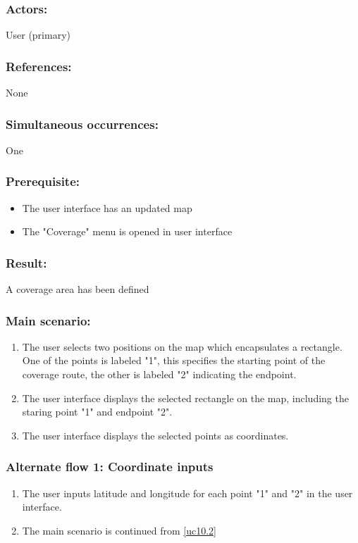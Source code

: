 \subsubsection*{Actors:}
User (primary)

\subsubsection*{References:}
None

\subsubsection*{Simultaneous occurrences:}
One

\subsubsection*{Prerequisite:}
\begin{itemize}
	\item The user interface has an updated map
	\item The "Coverage" menu is opened in user interface
\end{itemize}

\subsubsection*{Result:}
A coverage area has been defined

\subsubsection*{Main scenario:}
\begin{enumerate}
	\item The user selects two positions on the map which encapsulates a rectangle. One of the points is labeled "1", this specifies the starting point of the coverage route, the other is labeled "2" indicating the endpoint.
	\item \label{uc10.2} The user interface displays the selected rectangle on the map, including the staring point "1" and endpoint "2".
	\item The user interface displays the selected points as coordinates.
\end{enumerate}	

\subsubsection*{Alternate flow 1: Coordinate inputs}
\begin{enumerate}
	\item The user inputs latitude and longitude for each point "1" and "2" in the user interface.
	\item The main scenario is continued from \ref{uc10.2}
\end{enumerate}


